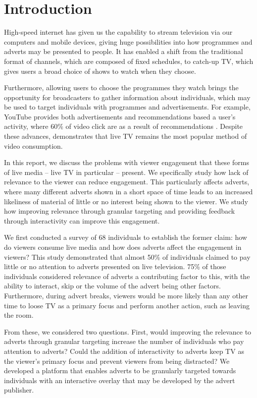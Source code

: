 \section{Introduction}
High-speed internet has given us the capability to stream television via our computers and mobile devices, giving huge possibilities into how programmes and adverts may be presented to people. It has enabled a shift from the traditional format of channels, which are composed of fixed schedules, to catch-up TV, which gives users a broad choice of shows to watch when they choose. 

Furthermore, allowing users to choose the programmes they watch brings the opportunity for broadcasters to gather information about individuals, which may be used to target individuals with programmes and advertisements. For example, YouTube provides both advertisements and recommendations based a user's activity, where 60\% of video click are as a result of recommendations \citep{davidson2012}. Despite these advances, \citet{three-screen} demonstrates that live TV remains the most popular method of video consumption.

In this report, we discuss the problems with viewer engagement that these forms of live media -- live TV in particular -- present. We specifically study how lack of relevance to the viewer can reduce engagement. This particularly affects adverts, where many different adverts shown in a short space of time leads to an increased likeliness of material of little or no interest being shown to the viewer. We study how improving relevance through granular targeting and providing feedback through interactivity can improve this engagement.

We first conducted a survey of 68 individuals to establish the former claim: how do viewers consume live media and how does adverts affect the engagement in viewers? This study demonstrated that almost 50\% of individuals claimed to pay little or no attention to adverts presented on live television. 75\% of those individuals considered relevance of adverts a contributing factor to this, with the ability to interact, skip or the volume of the advert being other factors. Furthermore, during advert breaks, viewers would be more likely than any other time to loose TV as a primary focus and perform another action, such as leaving the room.

From these, we considered two questions. First, would improving the relevance to adverts through granular targeting increase the number of individuals who pay attention to adverts? Could the addition of interactivity to adverts keep TV as the viewer's primary focus and prevent viewers from being distracted? We developed a platform that enables adverts to be granularly targeted towards individuals with an interactive overlay that may be developed by the advert publisher. 

